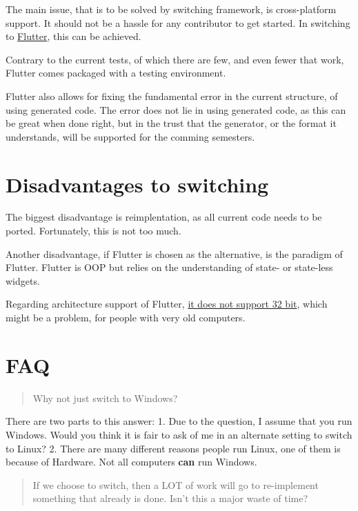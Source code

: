 The main issue, that is to be solved by switching framework, is
cross-platform support. It should not be a hassle for any contributor to
get started. In switching to \href{https://flutter.dev/}{Flutter}, this
can be achieved.

Contrary to the current tests, of which there are few, and even fewer
that work, Flutter comes packaged with a testing environment.

Flutter also allows for fixing the fundamental error in the current
structure, of using generated code. The error does not lie in using
generated code, as this can be great when done right, but in the trust
that the generator, or the format it understands, will be supported for
the comming semesters.

\section{Disadvantages to switching}

The biggest disadvantage is reimplentation, as all current code needs to
be ported. Fortunately, this is not too much.

Another disadvantage, if Flutter is chosen as the alternative, is the
paradigm of Flutter. Flutter is OOP but relies on the understanding of
state- or state-less widgets.

Regarding architecture support of Flutter,
\href{https://github.com/flutter/flutter/issues/14925}{it does not
support 32 bit}, which might be a problem, for people with very old
computers.

\section{FAQ}

\begin{quote}
Why not just switch to Windows?
\end{quote}

There are two parts to this answer: 1. Due to the question, I assume
that you run Windows. Would you think it is fair to ask of me in an
alternate setting to switch to Linux? 2. There are many different
reasons people run Linux, one of them is because of Hardware. Not all
computers \textbf{can} run Windows.

\begin{quote}
If we choose to switch, then a LOT of work will go to re-implement
something that already is done. Isn't this a major waste of time?
\end{quote}

